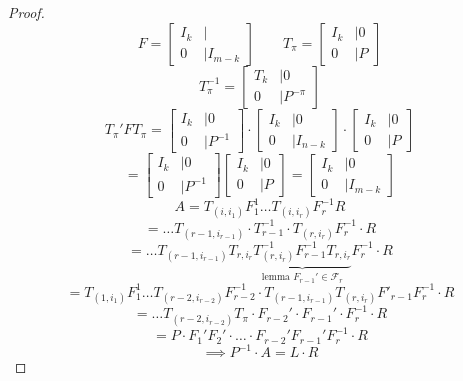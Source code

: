 \documentclass[a4paper,landscape,twocolumn]{article}
\begin{document}
\begin{proof}
  \[
    F = \begin{bmatrix}
      I_k &|  \\
    \hline
      0 &| I_{m-k}
    \end{bmatrix}
    \qquad
    T_\pi = \begin{bmatrix}
      I_k &| 0 \\
    \hline
      0 &| P
    \end{bmatrix}
  \] \[
    T_{\pi}^{-1} = \begin{bmatrix}
      T_k &| 0 \\
    \hline
      0 &| P^{-\pi}
    \end{bmatrix}
  \] \[
    T_{\pi}' F T_{\pi} = \begin{bmatrix}
      I_k &| 0 \\
      0 &| P^{-1}
    \end{bmatrix} \cdot \begin{bmatrix}
      I_k &| 0 \\
      0 &| I_{n-k}
    \end{bmatrix} \cdot \begin{bmatrix}
      I_k &| 0 \\
      0 &| P
    \end{bmatrix}
  \] \[
    = \begin{bmatrix}
      I_k &| 0 \\
      0 &| P^{-1}
    \end{bmatrix} \begin{bmatrix}
      I_k &| 0 \\
      0 &| P
    \end{bmatrix}
    =
    \begin{bmatrix}
      I_k &| 0 \\
      0 &| I_{m-k}
    \end{bmatrix}
  \] \[
    A = T_{(i,i_1)} F_1^1 \ldots T_{(i,i_r)} F_r^{-1} R
  \] \[
    = \ldots T_{(r-1, i_{r-1})} \cdot T_{r-1}^{-1} \cdot T_{(r,i_r)} F_r^{-1} \cdot R
  \] \[
    = \ldots T_{(r-1, i_{r-1})} T_{r,i_r} \underbrace{T_{(r,i_r)}^{-1} F_{r-1}^{-1} T_{r,i_r}}_{\text{lemma } F_{r-1}' \in \mathcal F_r} F_r^{-1} \cdot R
  \] \[
    = T_{(1,i_1)} F_1^1 \ldots T_{(r-2,i_{r-2})} F_{r-2}^{-1} \cdot T_{(r-1, i_{r-1})} T_{(r,i_r)} F'_{r-1} F_r^{-1} \cdot R
  \] \[
    = \ldots T_{(r-2,i_{r-2})} T_\pi \cdot F_{r-2}' \cdot F_{r-1}' \cdot F_r^{-1} \cdot R
  \] \[
    = P \cdot F_1' F_2' \cdot \ldots \cdot F_{r-2}' F_{r-1}' F_r^{-1} \cdot R
  \] \[
    \implies P^{-1} \cdot A = L \cdot R
  \]
\end{proof}
\end{document}
